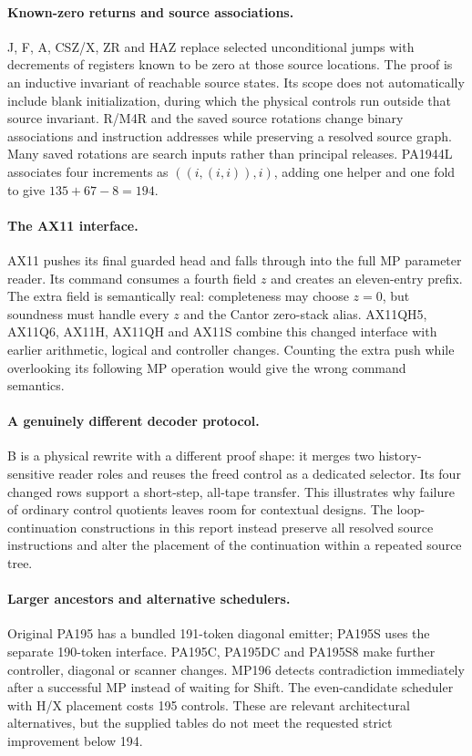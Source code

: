 \paragraph{Known-zero returns and source associations.}
J, F, A, CSZ/X, ZR and HAZ replace selected unconditional jumps with
decrements of registers known to be zero at those source locations.
The proof is an inductive invariant of reachable source states. Its
scope does not automatically include blank initialization, during
which the physical controls run outside that source invariant.
R/M4R and the saved source rotations change binary associations and
instruction addresses while preserving a resolved source graph.
Many saved rotations are search inputs rather than principal releases.
PA1944L associates four increments as $((i,(i,i)),i)$, adding one helper
and one fold to give $135+67-8=194$.

\paragraph{The AX11 interface.}
AX11 pushes its final guarded head and falls through into the full MP
parameter reader. Its command consumes a fourth field $z$ and creates
an eleven-entry prefix. The extra field is semantically real:
completeness may choose $z=0$, but soundness must handle every $z$ and
the Cantor zero-stack alias. AX11QH5, AX11Q6, AX11H, AX11QH and AX11S
combine this changed interface with earlier arithmetic, logical and
controller changes. Counting the extra push while overlooking its
following MP operation would give the wrong command semantics.

\paragraph{A genuinely different decoder protocol.}
B is a physical rewrite with a different proof shape: it merges two
history-sensitive reader roles and reuses the freed control as a
dedicated selector. Its four changed rows support a short-step,
all-tape transfer. This illustrates why failure of ordinary control
quotients leaves room for contextual designs. The loop-continuation
constructions in this report instead preserve all resolved source
instructions and alter the placement of the continuation within a
repeated source tree.

\paragraph{Larger ancestors and alternative schedulers.}
Original PA195 has a bundled 191-token diagonal emitter; PA195S uses
the separate 190-token interface. PA195C, PA195DC and PA195S8 make
further controller, diagonal or scanner changes. MP196 detects
contradiction immediately after a successful MP instead of waiting for
Shift. The even-candidate scheduler with H/X placement costs 195
controls. These are relevant architectural alternatives, but the supplied
tables do not meet the requested strict improvement below 194.

